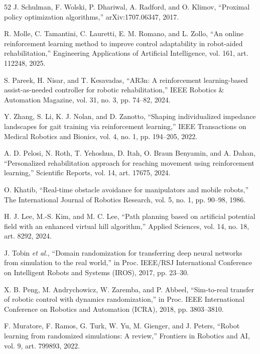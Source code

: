 \documentclass[journal,twoside,web]{ieeecolor2}
\newcounter{algorithm}
\begin{document}
\begin{thebibliography}{52}
\label{bib:b28} J. Schulman, F. Wolski, P. Dhariwal, A. Radford, and O. Klimov, ``Proximal policy optimization algorithms,'' arXiv:1707.06347, 2017.

\label{bib:b29} R. Molle, C. Tamantini, C. Lauretti, E. M. Romano, and L. Zollo, ``An online reinforcement learning method to improve control adaptability in robot-aided rehabilitation,'' Engineering Applications of Artificial Intelligence, vol. 161, art. 112248, 2025.

\label{bib:b30} S. Pareek, H. Nisar, and T. Kesavadas, ``AR3n: A reinforcement learning-based assist-as-needed controller for robotic rehabilitation,'' IEEE Robotics \& Automation Magazine, vol. 31, no. 3, pp. 74--82, 2024.

\label{bib:b31} Y. Zhang, S. Li, K. J. Nolan, and D. Zanotto, ``Shaping individualized impedance landscapes for gait training via reinforcement learning,'' IEEE Transactions on Medical Robotics and Bionics, vol. 4, no. 1, pp. 194--205, 2022.

\label{bib:b32} A. D. Pelosi, N. Roth, T. Yehoshua, D. Itah, O. Braun Benyamin, and A. Dahan, ``Personalized rehabilitation approach for reaching movement using reinforcement learning,'' Scientific Reports, vol. 14, art. 17675, 2024.

\label{bib:b33} O. Khatib, ``Real-time obstacle avoidance for manipulators and mobile robots,'' The International Journal of Robotics Research, vol. 5, no. 1, pp. 90--98, 1986.

\label{bib:b34} H. J. Lee, M.-S. Kim, and M. C. Lee, ``Path planning based on artificial potential field with an enhanced virtual hill algorithm,'' Applied Sciences, vol. 14, no. 18, art. 8292, 2024.

\label{bib:b35} J. Tobin \emph{et al.}, ``Domain randomization for transferring deep neural networks from simulation to the real world,'' in Proc. IEEE/RSJ International Conference on Intelligent Robots and Systems (IROS), 2017, pp. 23--30.

\label{bib:b36} X. B. Peng, M. Andrychowicz, W. Zaremba, and P. Abbeel, ``Sim-to-real transfer of robotic control with dynamics randomization,'' in Proc. IEEE International Conference on Robotics and Automation (ICRA), 2018, pp. 3803--3810.

\label{bib:b37} F. Muratore, F. Ramos, G. Turk, W. Yu, M. Gienger, and J. Peters, ``Robot learning from randomized simulations: A review,'' Frontiers in Robotics and AI, vol. 9, art. 799893, 2022.


\end{thebibliography}
\end{document}
